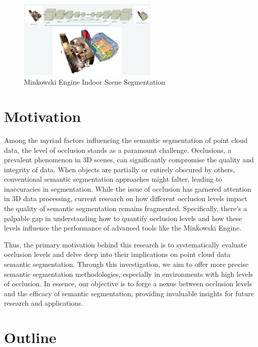\documentclass[11pt, a4paper,oneside,chapterprefix=false]{scrbook}
\begin{document}
\begin{figure}[h]
    \centering
    \includegraphics*[width=0.6\textwidth]{figures/Minkowski Engine.png}
    \caption{Minkowski Engine Indoor Scene Segmentation}
    \label{fig:minkowski}
\end{figure}



\section{Motivation} \label{sec:motivation}

Among the myriad factors influencing the semantic segmentation of point cloud data, the level of occlusion stands as a paramount challenge. Occlusions, a prevalent phenomenon in 3D scenes, can significantly compromise the quality and integrity of data. When objects are partially or entirely obscured by others, conventional semantic segmentation approaches might falter, leading to inaccuracies in segmentation. While the issue of occlusion has garnered attention in 3D data processing, current research on how different occlusion levels impact the quality of semantic segmentation remains fragmented. Specifically, there's a palpable gap in understanding how to quantify occlusion levels and how these levels influence the performance of advanced tools like the Minkowski Engine. 

Thus, the primary motivation behind this research is to systematically evaluate occlusion levels and delve deep into their implications on point cloud data semantic segmentation. Through this investigation, we aim to offer more precise semantic segmentation methodologies, especially in environments with high levels of occlusion. In essence, our objective is to forge a nexus between occlusion levels and the efficacy of semantic segmentation, providing invaluable insights for future research and applications.

\section{Outline} \label{sec:outline}
\end{document}
